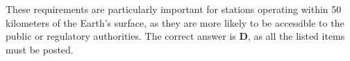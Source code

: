These requirements are particularly important for stations operating within 50 kilometers of the Earth’s surface, as they are more likely to be accessible to the public or regulatory authorities. The correct answer is \textbf{D}, as all the listed items must be posted.


